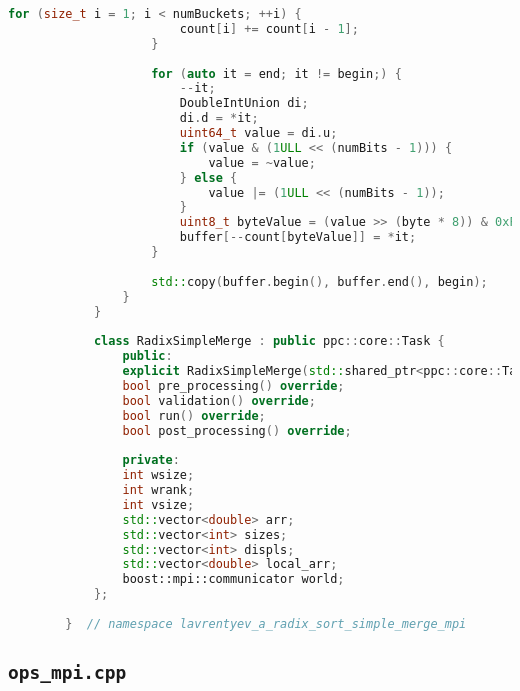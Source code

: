 \documentclass[12pt]{article}
\begin{document}
\begin{lstlisting}[language=C++]
					for (size_t i = 1; i < numBuckets; ++i) {
						count[i] += count[i - 1];
					}
					
					for (auto it = end; it != begin;) {
						--it;
						DoubleIntUnion di;
						di.d = *it;
						uint64_t value = di.u;
						if (value & (1ULL << (numBits - 1))) {
							value = ~value;
						} else {
							value |= (1ULL << (numBits - 1));
						}
						uint8_t byteValue = (value >> (byte * 8)) & 0xFF;
						buffer[--count[byteValue]] = *it;
					}
					
					std::copy(buffer.begin(), buffer.end(), begin);
				}
			}
			
			class RadixSimpleMerge : public ppc::core::Task {
				public:
				explicit RadixSimpleMerge(std::shared_ptr<ppc::core::TaskData> taskData_) : Task(std::move(taskData_)) {}
				bool pre_processing() override;
				bool validation() override;
				bool run() override;
				bool post_processing() override;
				
				private:
				int wsize;
				int wrank;
				int vsize;
				std::vector<double> arr;
				std::vector<int> sizes;
				std::vector<int> displs;
				std::vector<double> local_arr;
				boost::mpi::communicator world;
			};
			
		}  // namespace lavrentyev_a_radix_sort_simple_merge_mpi
	\end{lstlisting}
	
	\subsection*{\texttt{ops\_mpi.cpp}}
	
\end{document}
